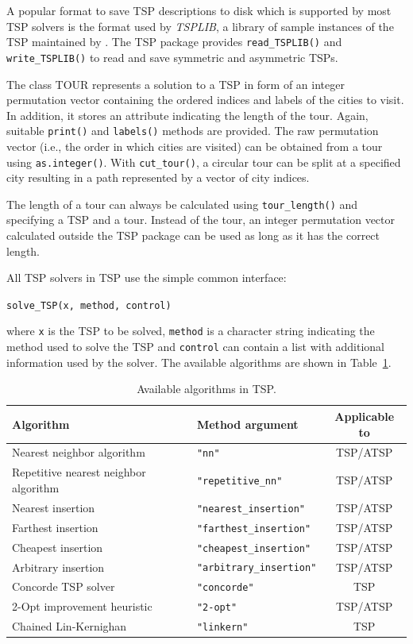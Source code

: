 \documentclass[10pt,a4paper,fleqn]{article}
\newcommand{\strong}[1]{{\normalfont\fontseries{b}\selectfont #1}}
\newcommand{\class}[1]{\mbox{\textsf{#1}}}
\newcommand{\func}[1]{\mbox{\texttt{#1()}}}
\newcommand{\code}[1]{\mbox{\texttt{#1}}}
\newcommand{\pkg}[1]{\strong{#1}}
\begin{document}
A popular format to save TSP descriptions to disk which is supported by
most TSP solvers is the format used by \emph{TSPLIB}, a library of
sample instances of the TSP maintained by \cite{Reinelt2004}. The
\pkg{TSP} package provides \func{read\_TSPLIB} and \func{write\_TSPLIB}
to read and save symmetric and asymmetric TSPs.

The class \class{TOUR} represents a solution to a TSP in form of an integer
permutation vector containing the ordered indices and labels of the cities to
visit. In addition, it stores an attribute indicating the length of the tour.
Again, suitable \func{print} and \func{labels} methods are provided.  The raw
permutation vector (i.e., the order in which cities are visited) can be
obtained from a tour using \func{as.integer}. With \func{cut\_tour}, a
circular tour can be split at a specified city resulting in a path represented
by a vector of city indices.

The length of a tour can always be calculated using \func{tour\_length} and
specifying a TSP and a tour. Instead of the tour, an integer permutation vector
calculated outside the \pkg{TSP} package can be used as long as it has the
correct length.

All TSP solvers in \pkg{TSP} use the simple common interface:

\begin{center}
\code{solve\_TSP(x, method, control)} 
\end{center}
where \code{x} is the TSP to be solved, \code{method} is a character
string indicating the method used to solve the TSP and \code{control}
can contain a list with additional information used by the solver.
The available algorithms are shown in Table~\ref{tab:methods}.    

\begin{table}
    \caption{Available algorithms in \pkg{TSP}.}\label{tab:methods}
    \centering
    \begin{tabular}{llc}
    \hline
    {\bf Algorithm} & {\bf Method argument} & {\bf Applicable to} \\
    \hline
    Nearest neighbor algorithm & \code{"nn"} & TSP/ATSP \\
    Repetitive nearest neighbor algorithm & \code{"repetitive\_nn"} 
            & TSP/ATSP \\
    Nearest insertion & \code{"nearest\_insertion"} & TSP/ATSP  \\
    Farthest insertion & \code{"farthest\_insertion"} & TSP/ATSP  \\
    Cheapest insertion & \code{"cheapest\_insertion"} & TSP/ATSP  \\
    Arbitrary insertion & \code{"arbitrary\_insertion"} & TSP/ATSP  \\
    Concorde TSP solver & \code{"concorde"} & TSP  \\
    2-Opt improvement heuristic &  \code{"2-opt"}  & TSP/ATSP \\
    Chained Lin-Kernighan &  \code{"linkern"}  & TSP \\
\hline
\end{tabular}
\end{table}
\end{document}
